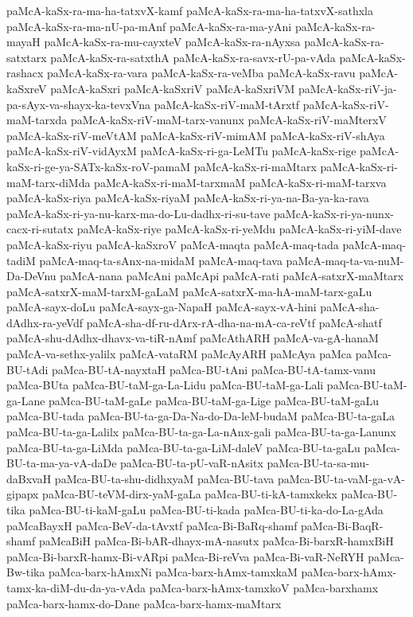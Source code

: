 {paMcA-kaSx-ra-ma-ha-tatxvX-kamf
paMcA-kaSx-ra-ma-ha-tatxvX-sathxla
paMcA-kaSx-ra-ma-nU-pa-mAnf
paMcA-kaSx-ra-ma-yAni
paMcA-kaSx-ra-mayaH
paMcA-kaSx-ra-mu-cayxteV
paMcA-kaSx-ra-nAyxsa
paMcA-kaSx-ra-satxtarx
paMcA-kaSx-ra-satxthA
paMcA-kaSx-ra-savx-rU-pa-vAda
paMcA-kaSx-rashacx
paMcA-kaSx-ra-vara
paMcA-kaSx-ra-veMba
paMcA-kaSx-ravu
paMcA-kaSxreV
paMcA-kaSxri
paMcA-kaSxriV
paMcA-kaSxriVM
paMcA-kaSx-riV-ja-pa-sAyx-va-shayx-ka-tevxVna
paMcA-kaSx-riV-maM-tArxtf
paMcA-kaSx-riV-maM-tarxda
paMcA-kaSx-riV-maM-tarx-vanunx
paMcA-kaSx-riV-maMterxV
paMcA-kaSx-riV-meVtAM
paMcA-kaSx-riV-mimAM
paMcA-kaSx-riV-shAya
paMcA-kaSx-riV-vidAyxM
paMcA-kaSx-ri-ga-LeMTu
paMcA-kaSx-rige
paMcA-kaSx-ri-ge-ya-SATx-kaSx-roV-pamaM
paMcA-kaSx-ri-maMtarx
paMcA-kaSx-ri-maM-tarx-diMda
paMcA-kaSx-ri-maM-tarxmaM
paMcA-kaSx-ri-maM-tarxva
paMcA-kaSx-riya
paMcA-kaSx-riyaM
paMcA-kaSx-ri-ya-na-Ba-ya-ka-rava
paMcA-kaSx-ri-ya-nu-karx-ma-do-Lu-dadhx-ri-su-tave
paMcA-kaSx-ri-ya-nunx-cacx-ri-sutatx
paMcA-kaSx-riye
paMcA-kaSx-ri-yeMdu
paMcA-kaSx-ri-yiM-dave
paMcA-kaSx-riyu
paMcA-kaSxroV
paMcA-maqta
paMcA-maq-tada
paMcA-maq-tadiM
paMcA-maq-ta-sAnx-na-midaM
paMcA-maq-tava
paMcA-maq-ta-va-nuM-Da-DeVnu
paMcA-nana
paMcAni
paMcApi
paMcA-rati
paMcA-satxrX-maMtarx
paMcA-satxrX-maM-tarxM-gaLaM
paMcA-satxrX-ma-hA-maM-tarx-gaLu
paMcA-sayx-doLu
paMcA-sayx-ga-NapaH
paMcA-sayx-vA-hini
paMcA-sha-dAdhx-ra-yeVdf
paMcA-sha-df-ru-dArx-rA-dha-na-mA-ca-reVtf
paMcA-shatf
paMcA-shu-dAdhx-dhavx-va-tiR-nAmf
paMcAthARH
paMcA-va-gA-hanaM
paMcA-va-sethx-yalilx
paMcA-vataRM
paMcAyARH
paMcAya
paMca
paMca-BU-tAdi
paMca-BU-tA-nayxtaH
paMca-BU-tAni
paMca-BU-tA-tamx-vanu
paMca-BUta
paMca-BU-taM-ga-La-Lidu
paMca-BU-taM-ga-Lali
paMca-BU-taM-ga-Lane
paMca-BU-taM-gaLe
paMca-BU-taM-ga-Lige
paMca-BU-taM-gaLu
paMca-BU-tada
paMca-BU-ta-ga-Da-Na-do-Da-leM-budaM
paMca-BU-ta-gaLa
paMca-BU-ta-ga-Lalilx
paMca-BU-ta-ga-La-nAnx-gali
paMca-BU-ta-ga-Lanunx
paMca-BU-ta-ga-LiMda
paMca-BU-ta-ga-LiM-daleV
paMca-BU-ta-gaLu
paMca-BU-ta-ma-ya-vA-daDe
paMca-BU-ta-pU-vaR-nAsitx
paMca-BU-ta-sa-mu-daBxvaH
paMca-BU-ta-shu-didhxyaM
paMca-BU-tava
paMca-BU-ta-vaM-ga-vA-gipapx
paMca-BU-teVM-dirx-yaM-gaLa
paMca-BU-ti-kA-tamxkekx
paMca-BU-tika
paMca-BU-ti-kaM-gaLu
paMca-BU-ti-kada
paMca-BU-ti-ka-do-La-gAda
paMcaBayxH
paMca-BeV-da-tAvxtf
paMca-Bi-BaRq-shamf
paMca-Bi-BaqR-shamf
paMcaBiH
paMca-Bi-bAR-dhayx-mA-nasutx
paMca-Bi-barxR-hamxBiH
paMca-Bi-barxR-hamx-Bi-vARpi
paMca-Bi-reVva
paMca-Bi-vaR-NeRYH
paMca-Bw-tika
paMca-barx-hAmxNi
paMca-barx-hAmx-tamxkaM
paMca-barx-hAmx-tamx-ka-diM-du-da-ya-vAda
paMca-barx-hAmx-tamxkoV
paMca-barxhamx
paMca-barx-hamx-do-Dane
paMca-barx-hamx-maMtarx
}
